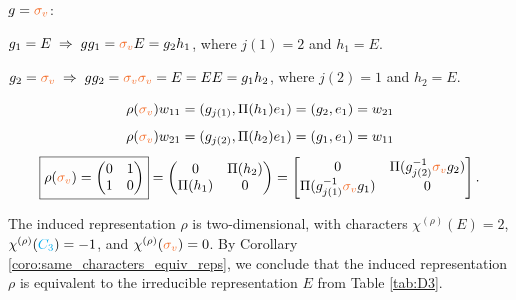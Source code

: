 \begin{example}
\n

$g = \sv$:

$g_1 = E \implies g g_1 = \sv E = g_2 h_1$, where $j(1) = 2$ and $h_1 = E$.

$g_2 = \sv \implies g g_2 = \sv \sv = E = E E = g_1 h_2$, where $j(2) = 1$ and $h_2 = E$.

\begin{equation} \label{eq:rhoC3_w11_example_inducedrep_C3D3}
\rho(\sv) w_{11} = (g_{j(1)}, \Pi(h_1) e_1) = \qty(g_2, e_1) = w_{21}
\end{equation}
\begin{equation} \label{eq:rhoC3_w21_example_inducedrep_C3D3}
\rho(\sv) w_{21} = (g_{j(2)}, \Pi(h_2) e_1) = \qty(g_1, e_1) = w_{11}
\end{equation}
\begin{equation} \label{eq:rhoC3_matrix_example_inducedrep_C3D3}
\boxed{ \rho(\sv) =
\begin{pmatrix}
0 & 1 \\
1 & 0
\end{pmatrix} } =
\begin{pmatrix}
0 & \Pi\qty(h_2) \\
\Pi\qty(h_1) & 0
\end{pmatrix} =
\begin{bmatrix}
0 & \Pi(g_{j(2)}^{-1} \sv g_2) \\
\Pi(g_{j(1)}^{-1} \sv g_1) & 0
\end{bmatrix}.
\end{equation}

The induced representation \(\rho\) is two-dimensional, with characters \(\chi^{(\rho)}(E) = 2\), \(\chi^{(\rho)}(\Ct) = -1\), and \(\chi^{(\rho)}(\sv) = 0\). By Corollary \ref{coro:same_characters_equiv_reps}, we conclude that the induced representation \(\rho\) is equivalent to the irreducible representation \(E\) from Table \ref{tab:D3}.

\end{example}

